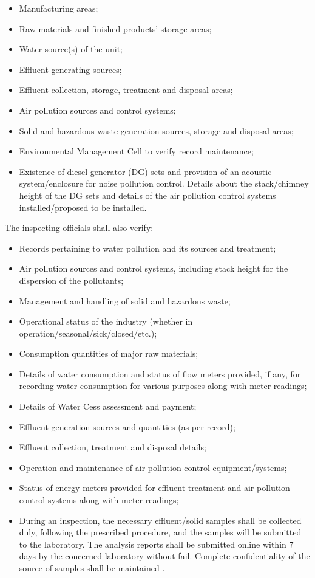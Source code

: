 \documentclass[a4paper, 12pt, twoside]{article}
\begin{document}
		\begin{itemize}
		\item{Manufacturing areas;}
		\item{Raw materials and finished products’ storage areas;}
		\item{Water source(s) of the unit;}
		\item{Effluent generating sources;}
		\item{Effluent collection, storage, treatment and disposal areas;}
		\item{Air pollution sources and control systems;}
		\item{Solid and hazardous waste generation sources, storage and disposal areas;}
		\item{Environmental Management Cell to verify record maintenance;}
		\item{Existence of diesel generator (DG) sets and provision of an acoustic system/enclosure for noise pollution control. Details about the stack/chimney height of the DG sets and details of the air pollution control systems installed/proposed to be installed.}
		\end{itemize}
		
		The inspecting officials shall also verify:
		
		\begin{itemize}
		\item{Records pertaining to water pollution and its sources and treatment;}
		\item{Air pollution sources and control systems, including stack height for the dispersion of the pollutants;}
		\item{Management and handling of solid and hazardous waste;}
		\item{Operational status of the industry (whether in operation/seasonal/sick/closed/etc.);}
		\item{Consumption quantities of major raw materials;}
		\item{Details of water consumption and status of flow meters provided, if any, for recording water consumption for various purposes along with meter readings;}
		\item{Details of Water Cess assessment and payment;}
		\item{Effluent generation sources and quantities (as per record);}
		\item{Effluent collection, treatment and disposal details;}
		\item{Operation and maintenance of air pollution control equipment/systems;}
		\item{Status of energy meters provided for effluent treatment and air pollution control systems along with meter readings;}
		\item{During an inspection, the necessary effluent/solid samples shall be collected duly, following the prescribed procedure, and the samples will be submitted to the laboratory. The analysis reports shall be submitted online within 7 days by the concerned laboratory without fail. Complete confidentiality of the source of samples shall be maintained \parencite{DPCCb}}.
		\end{itemize}
		
\end{document}
